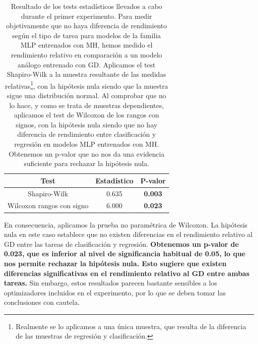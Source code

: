 \begin{table}[]
\centering
\begin{tabular}{|c|c|c|}
\cline{1-3}
                                Test                                                                   & Estadístico & P-valor        \\ \hline
\multicolumn{1}{|c|}{Shapiro-Wilk}                                 & 0.635       & \textbf{0.003}                      \\ \hline
\multicolumn{1}{|c|}{Wilcoxon rangos con signo} & 6.000       & \textbf{0.023}                       \\ \hline
\end{tabular}
\caption[Resultado de los tests estadísticos llevados a cabo durante el primer experimento]{Resultado de los tests estadísticos llevados a cabo durante el primer experimento. Para medir objetivamente que no haya diferencia de rendimiento según el tipo de tarea para modelos de la familia MLP entrenados con MH, hemos medido el rendimiento relativo en comparación a un modelo análogo entrenado con GD. Aplicamos el test Shapiro-Wilk a la muestra resultante de las medidas relativas\footnote{Realmente se lo aplicamos a una única muestra, que resulta de la diferencia de las muestras de regresión y clasificación.}, con la hipótesis nula siendo que la muestra sigue una distribución normal. Al comprobar que no lo hace, y como se trata de muestras dependientes, aplicamos el test de Wilcoxon de los rangos con signos, con la hipótesis nula siendo que no hay diferencia de rendimiento entre clasificación y regresión en modelos MLP entrenados con MH. Obtenemos un p-valor que no nos da una evidencia suficiente para rechazar la hipótesis nula.}
\label{tab:stats}
\end{table}

En consecuencia, aplicamos la prueba no paramétrica de Wilcoxon.  La hipótesis nula en este caso establece que no existen diferencias en el rendimiento relativo al GD entre las tareas de clasificación y regresión. \textbf{Obtenemos un p-valor de 0.023, que es inferior al nivel de significancia habitual de 0.05, lo que nos permite rechazar la hipótesis nula. Esto sugiere que existen diferencias significativas en el rendimiento relativo al GD entre ambas tareas.} Sin embargo, estos resultados parecen bastante sensibles a los optimizadores incluidos en el experimento, por lo que se deben tomar las conclusiones con cautela.






